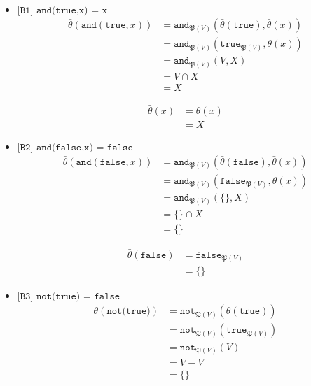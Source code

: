 \documentclass[a4paper,11pt]{article}
\begin{document}
\begin{itemize}

\item{$\texttt{[B1] and(true,x) = x}$}
\begin{align*}
\bar \theta(\texttt{and}(\texttt{true}, x)) &= \texttt{and}_{\mathfrak{P}(V)}(\bar \theta(\texttt{true}), \bar \theta(x)) \\
                                            &= \texttt{and}_{\mathfrak{P}(V)}(\texttt{true}_{\mathfrak{P}(V)}, \theta(x)) \\
                                            &= \texttt{and}_{\mathfrak{P}(V)}(V,X) \\
                                            &= V \cap X \\
                                            &= X
\end{align*}

\begin{align*}
\bar \theta(x) &= \theta(x) \\
               &= X
\end{align*}

\item{$\texttt{[B2] and(false,x) = false}$}
\begin{align*}
\bar \theta(\texttt{and}(\texttt{false}, x)) &= \texttt{and}_{\mathfrak{P}(V)}(\bar \theta(\texttt{false}), \bar \theta(x)) \\
                                             &= \texttt{and}_{\mathfrak{P}(V)}(\texttt{false}_{\mathfrak{P}(V)}, \theta(x)) \\
                                             &= \texttt{and}_{\mathfrak{P}(V)}(\{\},X) \\
                                             &= \{\} \cap X \\
                                             &= \{\}
\end{align*}

\begin{align*}
\bar \theta(\texttt{false}) &= \texttt{false}_{\mathfrak{P}(V)} \\
                            &= \{\}
\end{align*}

\item{$\texttt{[B3] not(true) = false}$}
\begin{align*}
\bar \theta(\texttt{not(true)}) &= \texttt{not}_{\mathfrak{P}(V)}(\bar \theta(\texttt{true})) \\
                                &= \texttt{not}_{\mathfrak{P}(V)}(\texttt{true}_{\mathfrak{P}(V)}) \\
                                &= \texttt{not}_{\mathfrak{P}(V)}(V) \\
                                &= V - V \\
                                &= \{\}
\end{align*}


\end{itemize}
\end{document}
